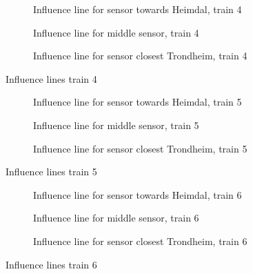 \begin{figure}[htpb]
  \centering
  \begin{subfigure}[t]{0.9\textwidth}
    
    \caption{Influence line for sensor towards Heimdal, train 4}
    \label{infl_Heimdal_train4}
  \end{subfigure}
  \centering
  \begin{subfigure}[t]{0.9\textwidth}
    
    \caption{Influence line for middle sensor, train 4}
    \label{infl_middle_train4}
  \end{subfigure}
  \begin{subfigure}[t]{0.9\textwidth}
    
    \caption{Influence line for sensor closest Trondheim, train 4}
    \label{infl_Trondheim_train4}
  \end{subfigure}
  \caption{Influence lines train 4}
  \label{influence_lines_train3}
\end{figure}

\begin{figure}[htpb]
  \centering
  \begin{subfigure}[t]{0.9\textwidth}
    
    \caption{Influence line for sensor towards Heimdal, train 5}
    \label{infl_Heimdal_train5}
  \end{subfigure}
  \centering
  \begin{subfigure}[t]{0.9\textwidth}
    
    \caption{Influence line for middle sensor, train 5}
    \label{infl_middle_train5}
  \end{subfigure}
  \begin{subfigure}[t]{0.9\textwidth}
    
    \caption{Influence line for sensor closest Trondheim, train 5}
    \label{infl_Trondheim_train5}
  \end{subfigure}
  \caption{Influence lines train 5}
  \label{influence_lines_train5}
\end{figure}

\begin{figure}[htpb]
  \centering
  \begin{subfigure}[t]{0.9\textwidth}
    
    \caption{Influence line for sensor towards Heimdal, train 6}
    \label{infl_Heimdal_train6}
  \end{subfigure}
  \centering
  \begin{subfigure}[t]{0.9\textwidth}
    
    \caption{Influence line for middle sensor, train 6}
    \label{infl_middle_train6}
  \end{subfigure}
  \begin{subfigure}[t]{0.9\textwidth}
    
    \caption{Influence line for sensor closest Trondheim, train 6}
    \label{infl_Trondheim_train6}
  \end{subfigure}
  \caption{Influence lines train 6}
  \label{influence_lines_train6}
\end{figure}

